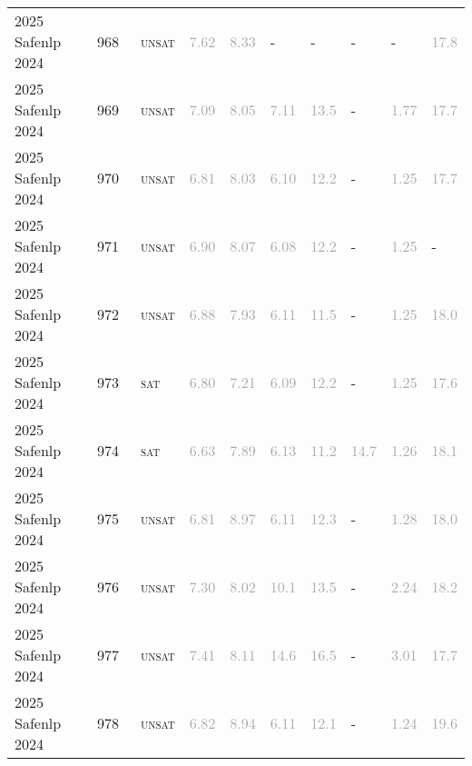 \begin{center}
{\begin{longtable}{@{}llllllllll@{}}
2025 Safenlp 2024 & 968 & ~\textsc{unsat} & \textcolor{darkgray}{7.62} & \textcolor{darkgray}{8.33} & - & - & - & - & \textcolor{darkgray}{17.8} \\
2025 Safenlp 2024 & 969 & ~\textsc{unsat} & \textcolor{darkgray}{7.09} & \textcolor{darkgray}{8.05} & \textcolor{darkgray}{7.11} & \textcolor{darkgray}{13.5} & - & \textcolor{darkgray}{1.77} & \textcolor{darkgray}{17.7} \\
2025 Safenlp 2024 & 970 & ~\textsc{unsat} & \textcolor{darkgray}{6.81} & \textcolor{darkgray}{8.03} & \textcolor{darkgray}{6.10} & \textcolor{darkgray}{12.2} & - & \textcolor{darkgray}{1.25} & \textcolor{darkgray}{17.7} \\
2025 Safenlp 2024 & 971 & ~\textsc{unsat} & \textcolor{darkgray}{6.90} & \textcolor{darkgray}{8.07} & \textcolor{darkgray}{6.08} & \textcolor{darkgray}{12.2} & - & \textcolor{darkgray}{1.25} & - \\
2025 Safenlp 2024 & 972 & ~\textsc{unsat} & \textcolor{darkgray}{6.88} & \textcolor{darkgray}{7.93} & \textcolor{darkgray}{6.11} & \textcolor{darkgray}{11.5} & - & \textcolor{darkgray}{1.25} & \textcolor{darkgray}{18.0} \\
2025 Safenlp 2024 & 973 & ~\textsc{sat} & \textcolor{darkgray}{6.80} & \textcolor{darkgray}{7.21} & \textcolor{darkgray}{6.09} & \textcolor{darkgray}{12.2} & - & \textcolor{darkgray}{1.25} & \textcolor{darkgray}{17.6} \\
2025 Safenlp 2024 & 974 & ~\textsc{sat} & \textcolor{darkgray}{6.63} & \textcolor{darkgray}{7.89} & \textcolor{darkgray}{6.13} & \textcolor{darkgray}{11.2} & \textcolor{darkgray}{14.7} & \textcolor{darkgray}{1.26} & \textcolor{darkgray}{18.1} \\
2025 Safenlp 2024 & 975 & ~\textsc{unsat} & \textcolor{darkgray}{6.81} & \textcolor{darkgray}{8.97} & \textcolor{darkgray}{6.11} & \textcolor{darkgray}{12.3} & - & \textcolor{darkgray}{1.28} & \textcolor{darkgray}{18.0} \\
2025 Safenlp 2024 & 976 & ~\textsc{unsat} & \textcolor{darkgray}{7.30} & \textcolor{darkgray}{8.02} & \textcolor{darkgray}{10.1} & \textcolor{darkgray}{13.5} & - & \textcolor{darkgray}{2.24} & \textcolor{darkgray}{18.2} \\
2025 Safenlp 2024 & 977 & ~\textsc{unsat} & \textcolor{darkgray}{7.41} & \textcolor{darkgray}{8.11} & \textcolor{darkgray}{14.6} & \textcolor{darkgray}{16.5} & - & \textcolor{darkgray}{3.01} & \textcolor{darkgray}{17.7} \\
2025 Safenlp 2024 & 978 & ~\textsc{unsat} & \textcolor{darkgray}{6.82} & \textcolor{darkgray}{8.94} & \textcolor{darkgray}{6.11} & \textcolor{darkgray}{12.1} & - & \textcolor{darkgray}{1.24} & \textcolor{darkgray}{19.6} \\

\end{longtable}}
\end{center}

